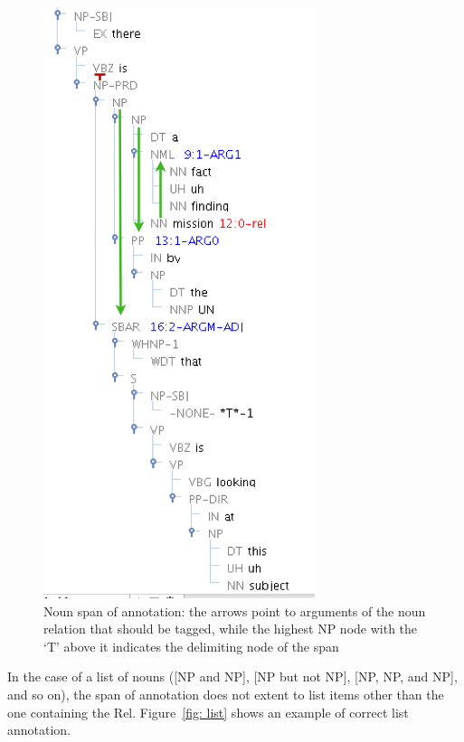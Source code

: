 \documentclass[11pt]{report}
\begin{document}
\begin{figure}[htbp]
\centering
\includegraphics[scale=0.5]{img/EmbeddedNPs.png}
\caption{Noun span of annotation: the arrows point to arguments of the noun relation that should be tagged, while the highest NP node with the `T' above it indicates the delimiting node of the span}
\label{fig: EmbeddedNPs}
\end{figure}

\pagebreak

In the case of a list of nouns ([NP and NP], [NP but not NP], [NP, NP, and NP], and so on), the span of annotation does not extent to list items other than the one containing the Rel. Figure~\ref{fig: list} shows an example of correct list annotation. 
\end{document}

